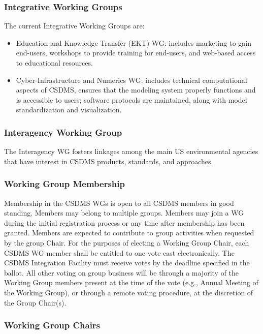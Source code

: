 \documentclass[11pt, oneside]{article}   	%
\begin{document}
\subsubsection{Integrative Working Groups}

The current Integrative Working Groups are: 
\begin{itemize}
\item  Education and Knowledge Transfer (EKT) WG: includes marketing to gain end-users, workshops to provide training for end-users, and web-based access to educational resources.  
\item  Cyber-Infrastructure and Numerics WG: includes technical computational aspects of CSDMS, ensures that the modeling system properly functions and is accessible to users; software protocols are maintained, along with model standardization and visualization.  
\end{itemize}

\subsubsection{Interagency Working Group}

The Interagency WG fosters linkages among the main US environmental agencies that have interest in CSDMS products, standards, and approaches.

\subsubsection{Working Group Membership}

Membership in the CSDMS WGs is open to all CSDMS members in good standing.  Members may belong to multiple groups.  Members may join a WG during the initial registration process or any time after membership has been granted. Members are expected to contribute to group activities when requested by the group Chair. For the purposes of electing a Working Group Chair, each CSDMS WG member shall be entitled to one vote cast electronically.  The CSDMS Integration Facility must receive votes by the deadline specified in the ballot.  All other voting on group business will be through a majority of the Working Group members present at the time of the vote (e.g., Annual Meeting of the Working Group), or through a remote voting procedure, at the discretion of the Group Chair(s).

\subsubsection{Working Group Chairs}
\end{document}
